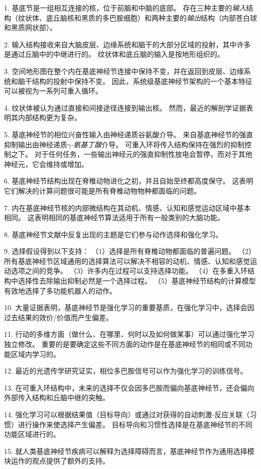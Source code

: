 1. 基底节是一组相互连接的核，位于前脑和中脑的底部。
存在三种主要的\textit{输入}结构（纹状体、底丘脑核和黑质的多巴胺细胞）和两种主要的\textit{输出}结构（内部苍白球和黑质网状部）。


2. 输入结构接收来自大脑皮层、边缘系统和脑干的大部分区域的投射，其中许多是通过丘脑中的中继进行的。
纹状体和底丘脑的输入是按地形组织的。


3. 空间地形图在整个内在基底神经节连接中保持不变，并在返回到皮层、边缘系统和脑干结构的投射中保持不变。
因此，系统级基底神经节架构的一个基本特征可以被视为一系列可重入循环。


4. 纹状体被认为通过直接和间接途径连接到输出核。
然而，最近的解剖学证据表明其内部结构更为复杂。


5. 基底神经节的相位兴奋性输入由神经递质谷氨酸介导。
来自基底神经节的强直抑制输出由神经递质\textit{$\gamma$-氨基丁酸}介导。
可重入环将传入结构保持在强烈的抑制控制之下。
对于任何任务，一些输出神经元的强直抑制性放电会暂停，而对于其他神经元，它会维持或增加。


6. 基底神经节结构出现在脊椎动物进化之初，并且自始至终都高度保守。
这表明它们解决的计算问题很可能是所有脊椎动物物种都面临的问题。


7. 内在基底神经节核的内部微结构在其动机、情感、认知和感觉运动区域中基本相同。
这表明相同的基底神经节算法适用于所有一般类别的大脑功能。


8. 基底神经节文献中反复出现的主题是它们参与动作选择和强化学习。


9. 选择假设得到以下支持：
（1）选择是所有脊椎动物都面临的普遍问题。
（2）所有基底神经节区域通用的选择算法可以解决不相容的动机、情感、认知和感觉运动选项之间的竞争。
（3）许多内在过程可以支持选择功能。
（4）在多重入环结构中选择性去除输出抑制必然是一个选择过程。
（5）基底神经节结构的计算模型有效地选择了多功能机器人的动作。 


10. 大量证据表明，基底神经节是强化学习的重要基质，在强化学习中，选择会因过去结果的效价/价值而产生偏差。


11. 行动的多维方面（做什么、在哪里、何时以及如何做某事）可以通过强化学习独立修改。
重要的是要确定这些不同方面的动作是在基底神经节的相同或不同功能区域内学习的。


12. 最近的光遗传学研究证实，相位多巴胺信号可以作为强化学习的训练信号。


13. 在可重入环结构中，未来的选择不仅会因多巴胺而偏向基底神经节，还会偏向外部传入结构和丘脑中继的突触。


14. 强化学习可以根据结果值（目标导向）或通过对获得的自动刺激-反应关联（习惯）进行操作来使选择产生偏差。
目标导向和习惯性选择是在基底神经节的不同功能区域进行的。


15. 就人类基底神经节疾病可以解释为选择障碍而言，基底神经节作为通用选择模块运作的观点提供了额外的支持。

